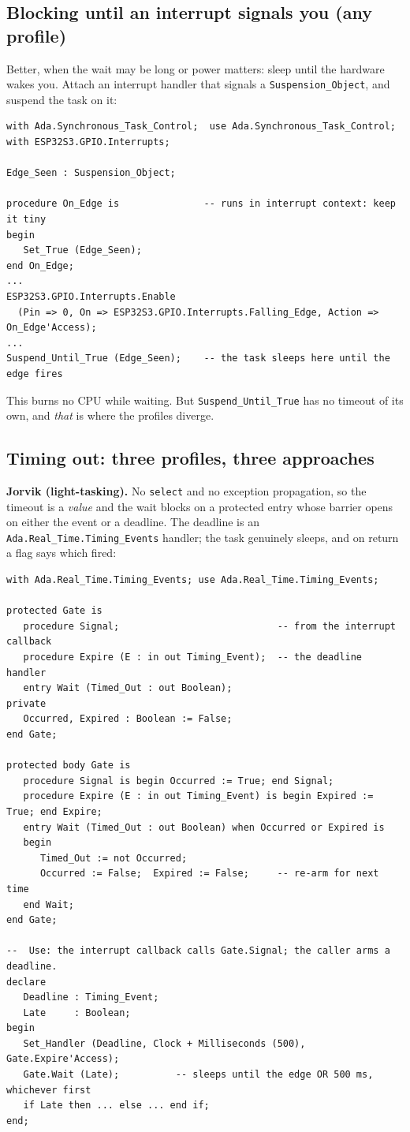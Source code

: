 \subsection{Blocking until an interrupt signals you (any profile)}

Better, when the wait may be long or power matters: sleep until the hardware wakes
you. Attach an interrupt handler that signals a \texttt{Suspension\_Object}, and
suspend the task on it:

\begin{lstlisting}
with Ada.Synchronous_Task_Control;  use Ada.Synchronous_Task_Control;
with ESP32S3.GPIO.Interrupts;

Edge_Seen : Suspension_Object;

procedure On_Edge is               -- runs in interrupt context: keep it tiny
begin
   Set_True (Edge_Seen);
end On_Edge;
...
ESP32S3.GPIO.Interrupts.Enable
  (Pin => 0, On => ESP32S3.GPIO.Interrupts.Falling_Edge, Action => On_Edge'Access);
...
Suspend_Until_True (Edge_Seen);    -- the task sleeps here until the edge fires
\end{lstlisting}

This burns no CPU while waiting. But \texttt{Suspend\_Until\_True} has no timeout
of its own, and \emph{that} is where the profiles diverge.

\subsection{Timing out: three profiles, three approaches}

\textbf{Jorvik (light-tasking).} No \texttt{select} and no exception propagation,
so the timeout is a \emph{value} and the wait blocks on a protected entry whose
barrier opens on either the event or a deadline. The deadline is an
\texttt{Ada.Real\_Time.Timing\_Events} handler; the task genuinely sleeps, and on
return a flag says which fired:

\begin{lstlisting}
with Ada.Real_Time.Timing_Events; use Ada.Real_Time.Timing_Events;

protected Gate is
   procedure Signal;                            -- from the interrupt callback
   procedure Expire (E : in out Timing_Event);  -- the deadline handler
   entry Wait (Timed_Out : out Boolean);
private
   Occurred, Expired : Boolean := False;
end Gate;

protected body Gate is
   procedure Signal is begin Occurred := True; end Signal;
   procedure Expire (E : in out Timing_Event) is begin Expired := True; end Expire;
   entry Wait (Timed_Out : out Boolean) when Occurred or Expired is
   begin
      Timed_Out := not Occurred;
      Occurred := False;  Expired := False;     -- re-arm for next time
   end Wait;
end Gate;

--  Use: the interrupt callback calls Gate.Signal; the caller arms a deadline.
declare
   Deadline : Timing_Event;
   Late     : Boolean;
begin
   Set_Handler (Deadline, Clock + Milliseconds (500), Gate.Expire'Access);
   Gate.Wait (Late);          -- sleeps until the edge OR 500 ms, whichever first
   if Late then ... else ... end if;
end;
\end{lstlisting}

